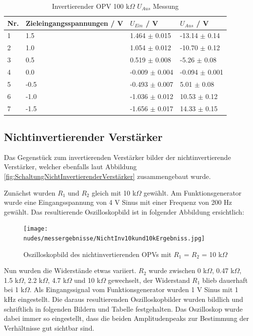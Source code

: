 \documentclass[12pt,a4paper,twoside]{article}
\begin{document}
\begin{table}[H]
    \centering
    \caption{Invertierender OPV 100 k$\Omega$ $U_{Aus}$ Messung}
    \label{tab:IoVerstärkungenGemessen100}
    \begin{tabular}{| l | l | l | l |}
        \hline
        Nr. & Zieleingangsspannungen / V & $U_{Ein}$ / V & $U_{Aus}$ / V \\
        \hline
        1 &  1.5 &  1.464 $\pm$ 0.015 & -13.14  $\pm$ 0.14  \\
        2 &  1.0 &  1.054 $\pm$ 0.012 & -10.70  $\pm$ 0.12  \\
        3 &  0.5 &  0.519 $\pm$ 0.008 &  -5.26  $\pm$ 0.08  \\
        4 &  0.0 & -0.009 $\pm$ 0.004 &  -0.094 $\pm$ 0.001 \\
        5 & -0.5 & -0.493 $\pm$ 0.007 &   5.01  $\pm$ 0.08  \\
        6 & -1.0 & -1.036 $\pm$ 0.012 &  10.53  $\pm$ 0.12  \\
        7 & -1.5 & -1.656 $\pm$ 0.017 &  14.33  $\pm$ 0.15  \\
        \hline
    \end{tabular}
\end{table}


\subsection{Nichtinvertierender Verstärker}

Das Gegenstück zum invertierenden Verstärker bilder der nichtinvertierende Verstärker, welcher ebenfalls laut Abbildung \ref{fig:SchaltungNichtInvertierenderVerstärker} zusammengebaut wurde. \newline

\noindent
Zunächst wurden $R_{1}$ und $R_{2}$ gleich mit 10 k$\Omega$ gewählt. Am Funktionsgenerator wurde eine Eingangsspannung von 4 V Sinus mit einer Frequenz von 200 Hz gewählt. Das resultierende Oszilloskopbild ist in folgender Abbildung ersichtlich:

\begin{figure}[H]
    \centering
    \texttt{[image: nudes/messergebnisse/NichtInv10kund10kErgebniss.jpg]}
    \caption{Oszilloskopbild des nichtinvertierenden OPVs mit $R_{1}$ = $R_{2}$ = 10 k$\Omega$}
    \label{fig:Nichtinvertierender10k10kOszibild}
\end{figure}

\noindent
Nun wurden die Widerstände etwas variiert. $R_{2}$ wurde zwischen 0 k$\Omega$, 0.47 k$\Omega$, 1.5 k$\Omega$, 2.2 k$\Omega$, 4.7 k$\Omega$ und 10 k$\Omega$ gewechselt, der Widerstand $R_{1}$ blieb dauerhaft bei 1 k$\Omega$. Als Eingangssignal vom Funktionsgenerator wurden 1 V Sinus mit 1 kHz eingestellt.
Die daraus resultierenden Oszilloskopbilder wurden bildlich und schriftlich in folgenden Bildern und Tabelle festgehalten. Das Oszilloskop wurde dabei immer so eingestellt, dass die beiden Amplitudenpeaks zur Bestimmung der Verhältnisse gut sichtbar sind.
\end{document}
